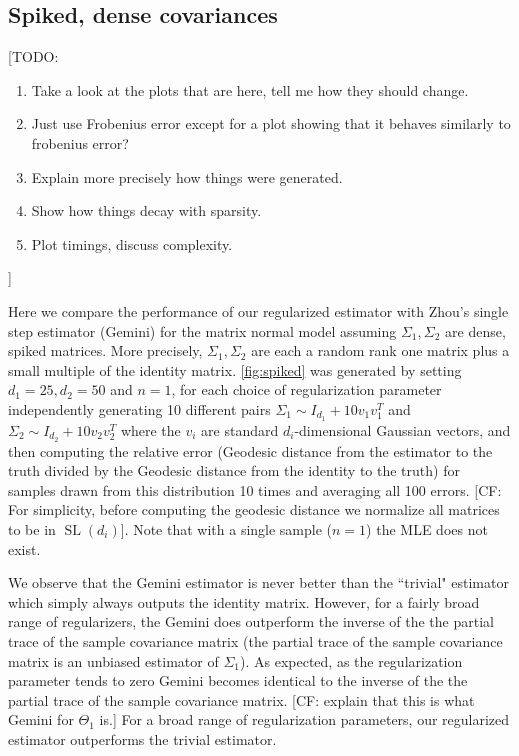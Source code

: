 \documentclass[aos]{imsart}
\theoremstyle{definition}
\numberwithin{equation}{section}
\newcommand{\SL}{\operatorname{SL}}
\newcommand{\CF}[1]{{\color{purple}[CF: #1]}}
\newcommand{\TODO}[1]{{\color{blue}[TODO: #1]}}
\begin{document}
\subsection{Spiked, dense covariances}


\TODO{
\begin{enumerate}
\item Take a look at the plots that are here, tell me how they should change.
\item Just use Frobenius error except for a plot showing that it behaves similarly to frobenius error?
\item Explain more precisely how things were generated.
\item Show how things decay with sparsity.
\item Plot timings, discuss complexity.
\end{enumerate} }

Here we compare the performance of our regularized estimator with Zhou's single step estimator (Gemini) for the matrix normal model assuming $\Sigma_1, \Sigma_2$ are dense, spiked matrices. More precisely, $\Sigma_1, \Sigma_2$ are each a random rank one matrix plus a small multiple of the identity matrix. \cref{fig:spiked} was generated by setting $d_1 = 25, d_2 = 50$ and $n = 1$, for each choice of regularization parameter independently generating 10 different pairs $\Sigma_1 \sim I_{d_1} + 10 v_1v_1^T$ and $\Sigma_2 \sim I_{d_2} + 10 v_2v_2^T$ where the $v_i$ are standard $d_i$-dimensional Gaussian vectors, and then computing the relative error (Geodesic distance from the estimator to the truth divided by the Geodesic distance from the identity to the truth) for samples drawn from this distribution 10 times and averaging all 100 errors. \CF{For simplicity, before computing the geodesic distance we normalize all matrices to be in $\SL(d_i)$}. Note that with a single sample ($n = 1$) the MLE does not exist. 

We observe that the Gemini estimator is never better than the ``trivial" estimator which simply always outputs the identity matrix. However, for a fairly broad range of regularizers, the Gemini does outperform the inverse of the the partial trace of the sample covariance matrix (the partial trace of the sample covariance matrix is an unbiased estimator of $\Sigma_1$). As expected, as the regularization parameter tends to zero Gemini becomes identical to the inverse of the the partial trace of the sample covariance matrix. \CF{explain that this is what Gemini for $\Theta_1$ is.} For a broad range of regularization parameters, our regularized estimator outperforms the trivial estimator.
\end{document}
